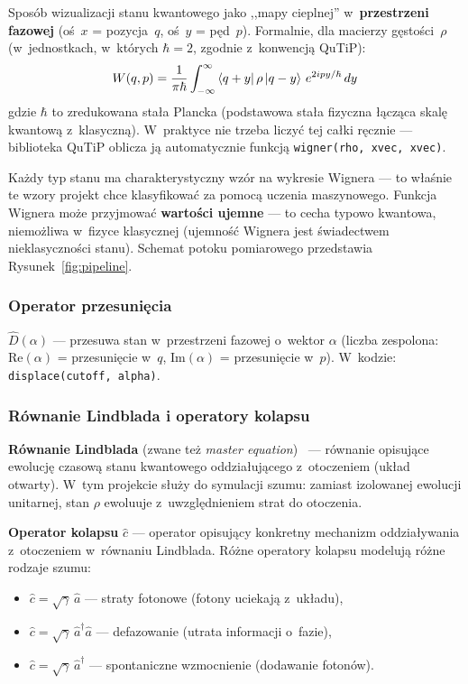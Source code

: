 \documentclass[12pt,a4paper]{article}
\begin{document}
Sposób wizualizacji stanu kwantowego jako ,,mapy cieplnej'' w~\textbf{przestrzeni fazowej} (oś~$x$ = pozycja~$q$, oś~$y$ = pęd~$p$). Formalnie, dla macierzy gęstości~$\rho$ (w~jednostkach, w~których $\hbar = 2$, zgodnie z~konwencją QuTiP):
\begin{equation}
    W(q, p) = \frac{1}{\pi\hbar} \int_{-\infty}^{\infty} \bra{q + y}\rho\ket{q - y}\, e^{2ipy/\hbar}\, dy
    \label{eq:wigner}
\end{equation}
gdzie $\hbar$ to zredukowana stała Plancka (podstawowa stała fizyczna łącząca skalę kwantową z~klasyczną). W~praktyce nie trzeba liczyć tej całki ręcznie --- biblioteka QuTiP oblicza ją automatycznie funkcją \texttt{wigner(rho, xvec, xvec)}.

Każdy typ stanu ma charakterystyczny wzór na wykresie Wignera --- to właśnie te wzory projekt chce klasyfikować za pomocą uczenia maszynowego. Funkcja Wignera może przyjmować \textbf{wartości ujemne} --- to cecha typowo kwantowa, niemożliwa w~fizyce klasycznej (ujemność Wignera jest świadectwem nieklasyczności stanu). Schemat potoku pomiarowego przedstawia Rysunek~\ref{fig:pipeline}.

\subsubsection{Operator przesunięcia}

$\hat{D}(\alpha)$ --- przesuwa stan w~przestrzeni fazowej o~wektor $\alpha$ (liczba zespolona: $\mathrm{Re}(\alpha)$ = przesunięcie w~$q$, $\mathrm{Im}(\alpha)$ = przesunięcie w~$p$). W~kodzie: \texttt{displace(cutoff, alpha)}.

\subsubsection{Równanie Lindblada i operatory kolapsu}

\textbf{Równanie Lindblada} (zwane też \emph{master equation})~\cite{lindblad1976} --- równanie opisujące ewolucję czasową stanu kwantowego oddziałującego z~otoczeniem (układ otwarty). W~tym projekcie służy do symulacji szumu: zamiast izolowanej ewolucji unitarnej, stan $\rho$ ewoluuje z~uwzględnieniem strat do otoczenia.

\textbf{Operator kolapsu} $\hat{c}$ --- operator opisujący konkretny mechanizm oddziaływania z~otoczeniem w~równaniu Lindblada. Różne operatory kolapsu modelują różne rodzaje szumu:
\begin{itemize}
    \item $\hat{c} = \sqrt{\gamma}\,\hat{a}$ --- straty fotonowe (fotony uciekają z~układu),
    \item $\hat{c} = \sqrt{\gamma}\,\hat{a}^\dagger\hat{a}$ --- defazowanie (utrata informacji o~fazie),
    \item $\hat{c} = \sqrt{\gamma}\,\hat{a}^\dagger$ --- spontaniczne wzmocnienie (dodawanie fotonów).
\end{itemize}
\end{document}
